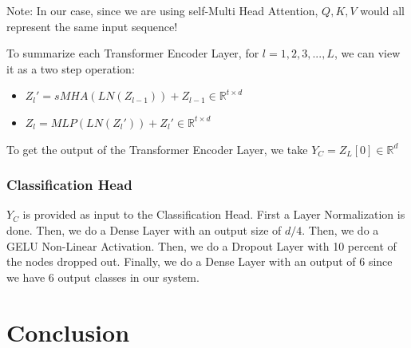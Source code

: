 \documentclass[11pt]{article}
\begin{document}
Note: In our case, since we are using self-Multi Head Attention, $Q, K, V$ would all represent the same input sequence! \newline 

To summarize each Transformer Encoder Layer, for $l = 1, 2, 3, ..., L$, we can view it as a two step operation: 
\begin{itemize}
    \item $Z_l ' = sMHA(LN(Z_{l-1})) + Z_{l - 1} \in \mathbb{R}^{t \times d}$
    \item $Z_l = MLP(LN(Z_{l} ')) + Z_{l} ' \in \mathbb{R}^{t \times d}$
\end{itemize}

To get the output of the Transformer Encoder Layer, we take $Y_C = Z_L[0] \in \mathbb{R}^d$ \newline 

\subsubsection{Classification Head}
$Y_C$ is provided as input to the Classification Head. First a Layer Normalization is done. Then, we do a Dense Layer with an output size of $d/4$. Then, we do a GELU Non-Linear Activation. Then, we do a Dropout Layer with 10 percent of the nodes dropped out. Finally, we do a Dense Layer with an output of 6 since we have 6 output classes in our system. 

\section{Conclusion}
\end{document}
